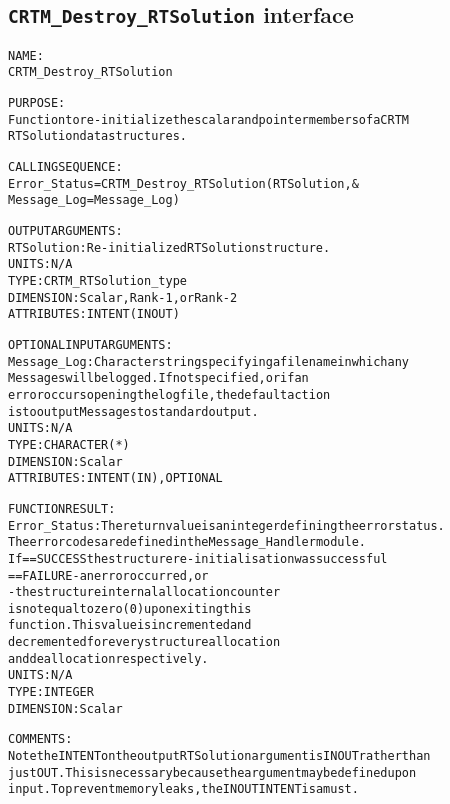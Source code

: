 \subsection{\texttt{CRTM\_Destroy\_RTSolution} interface}
  \label{sec:CRTM_Destroy_RTSolution_interface}
  \begin{alltt}
 
  NAME:
        CRTM_Destroy_RTSolution
  
  PURPOSE:
        Function to re-initialize the scalar and pointer members of a CRTM
        RTSolution data structures.
 
  CALLING SEQUENCE:
        Error_Status = CRTM_Destroy_RTSolution( RTSolution             , &
                                                Message_Log=Message_Log  )
  
  OUTPUT ARGUMENTS:
        RTSolution:  Re-initialized RTSolution structure.
                      UNITS:      N/A
                      TYPE:       CRTM_RTSolution_type
                      DIMENSION:  Scalar, Rank-1, or Rank-2
                      ATTRIBUTES: INTENT(IN OUT)
 
  OPTIONAL INPUT ARGUMENTS:
        Message_Log:  Character string specifying a filename in which any
                      Messages will be logged. If not specified, or if an
                      error occurs opening the log file, the default action
                      is to output Messages to standard output.
                      UNITS:      N/A
                      TYPE:       CHARACTER(*)
                      DIMENSION:  Scalar
                      ATTRIBUTES: INTENT(IN), OPTIONAL
 
  FUNCTION RESULT:
        Error_Status: The return value is an integer defining the error status.
                      The error codes are defined in the Message_Handler module.
                      If == SUCCESS the structure re-initialisation was successful
                         == FAILURE - an error occurred, or
                                    - the structure internal allocation counter
                                      is not equal to zero (0) upon exiting this
                                      function. This value is incremented and
                                      decremented for every structure allocation
                                      and deallocation respectively.
                      UNITS:      N/A
                      TYPE:       INTEGER
                      DIMENSION:  Scalar
 
  COMMENTS:
        Note the INTENT on the output RTSolution argument is IN OUT rather than
        just OUT. This is necessary because the argument may be defined upon
        input. To prevent memory leaks, the IN OUT INTENT is a must.
 
  \end{alltt}
